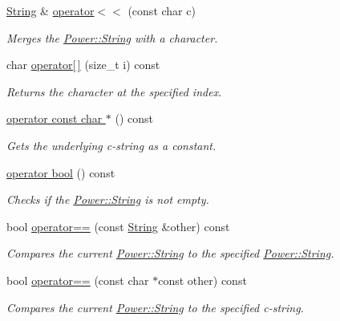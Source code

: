 \begin{DoxyCompactItemize}
\hyperlink{class_power_1_1_string}{String} \& \hyperlink{class_power_1_1_string_af89ae1a7a705b6667290a08b911e3971}{operator$<$$<$} (const char c)
\begin{DoxyCompactList}\small\item\em Merges the \hyperlink{class_power_1_1_string}{Power\+::\+String} with a character. \end{DoxyCompactList}\item 
char \hyperlink{class_power_1_1_string_a9205107e5478a19d5f54cf0db0677be4}{operator\mbox{[}$\,$\mbox{]}} (size\+\_\+t i) const
\begin{DoxyCompactList}\small\item\em Returns the character at the specified index. \end{DoxyCompactList}\item 
\hyperlink{class_power_1_1_string_acf417d8914b4ae725691e8cd08b2911a}{operator const char $\ast$} () const
\begin{DoxyCompactList}\small\item\em Gets the underlying c-\/string as a constant. \end{DoxyCompactList}\item 
\hyperlink{class_power_1_1_string_ae3250de28f41985a467a1bad990ed9db}{operator bool} () const
\begin{DoxyCompactList}\small\item\em Checks if the \hyperlink{class_power_1_1_string}{Power\+::\+String} is not empty. \end{DoxyCompactList}\item 
bool \hyperlink{class_power_1_1_string_ae4616e12ee74fcb4f86ffaa15560854b}{operator==} (const \hyperlink{class_power_1_1_string}{String} \&other) const
\begin{DoxyCompactList}\small\item\em Compares the current \hyperlink{class_power_1_1_string}{Power\+::\+String} to the specified \hyperlink{class_power_1_1_string}{Power\+::\+String}. \end{DoxyCompactList}\item 
bool \hyperlink{class_power_1_1_string_ae357277377a5d612450fcf852ba5bee9}{operator==} (const char $\ast$const other) const
\begin{DoxyCompactList}\small\item\em Compares the current \hyperlink{class_power_1_1_string}{Power\+::\+String} to the specified c-\/string. \end{DoxyCompactList}\item 

\end{DoxyCompactItemize}
